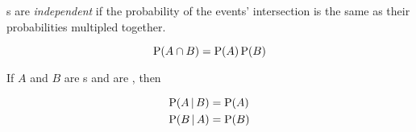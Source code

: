 \begin{definition}[Independent]\label{def:Events_Independent}
  s are \emph{independent} if the probability of the events' intersection is the same as their probabilities multipled together.

  \begin{equation}\label{eq:Events_Independent}
    \operatorname{\operatorname{P}}(A \cap B) = \operatorname{\operatorname{P}}(A) \operatorname{\operatorname{P}}(B)
  \end{equation}

  \begin{remark}
    If $A$ and $B$ are s and are , then

    \begin{equation}\label{eq:Conditional_Probability_Events_Independent}
      \begin{aligned}
        \operatorname{\operatorname{P}}(A \operatorname{\vert} B) &= \operatorname{\operatorname{P}}(A) \\
        \operatorname{\operatorname{P}}(B \operatorname{\vert} A) &= \operatorname{\operatorname{P}}(B) \\
      \end{aligned}
    \end{equation}
  \end{remark}
\end{definition}

